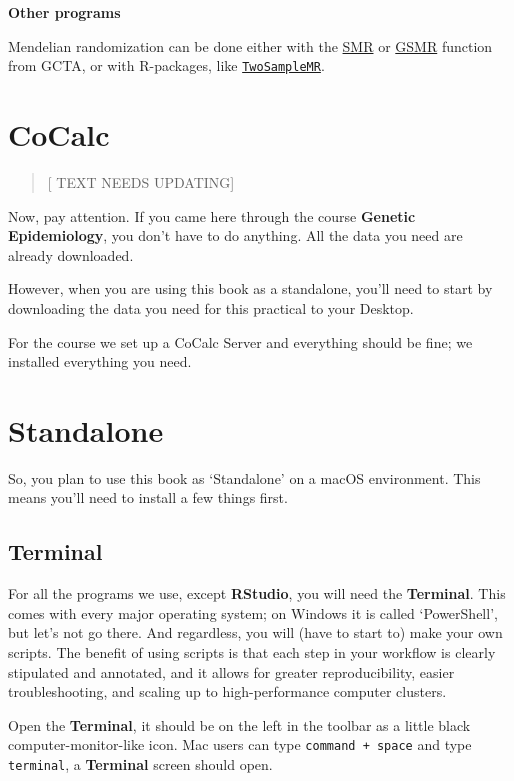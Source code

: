 \documentclass[
]{book}
\newcommand{\passthrough}[1]{#1}
\begin{document}
\textbf{Other programs}

Mendelian randomization can be done either with the \href{http://cnsgenomics.com/software/smr/\#Overview}{SMR} or \href{http://cnsgenomics.com/software/gsmr/}{GSMR} function from GCTA, or with R-packages, like \href{https://mrcieu.github.io/TwoSampleMR/}{\passthrough{\lstinline!TwoSampleMR!}}.

\hypertarget{cocalc}{%
\section{CoCalc}\label{cocalc}}

\begin{quote}
{[} TEXT NEEDS UPDATING{]}
\end{quote}

Now, pay attention. If you came here through the course \textbf{Genetic Epidemiology}, you don't have to do anything. All the data you need are already downloaded.

However, when you are using this book as a standalone, you'll need to start by downloading the data you need for this practical to your Desktop.

For the course we set up a CoCalc Server and everything should be fine; we installed everything you need.

\hypertarget{standalone}{%
\section{Standalone}\label{standalone}}

So, you plan to use this book as `Standalone' on a macOS environment. This means you'll need to install a few things first.

\hypertarget{terminal}{%
\subsection{Terminal}\label{terminal}}

For all the programs we use, except \textbf{RStudio}, you will need the \textbf{Terminal}. This comes with every major operating system; on Windows it is called `PowerShell', but let's not go there. And regardless, you will (have to start to) make your own scripts. The benefit of using scripts is that each step in your workflow is clearly stipulated and annotated, and it allows for greater reproducibility, easier troubleshooting, and scaling up to high-performance computer clusters.

Open the \textbf{Terminal}, it should be on the left in the toolbar as a little black computer-monitor-like icon. Mac users can type \passthrough{\lstinline!command + space!} and type \passthrough{\lstinline!terminal!}, a \textbf{Terminal} screen should open.
\end{document}
